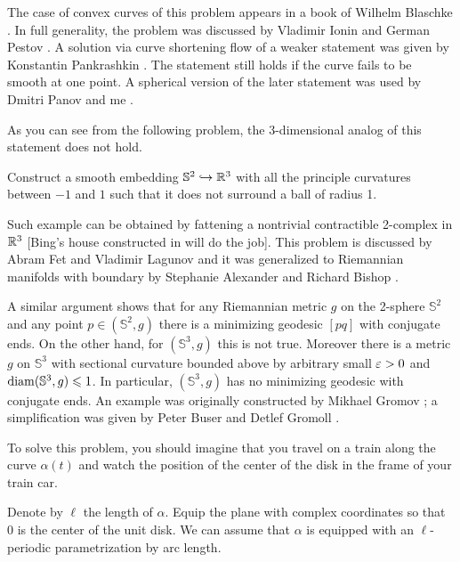 The case of convex curves of this problem appears in a book of Wilhelm Blaschke \cite[see \S 24 in][]{blaschke}.
In full generality, the problem was discussed by Vladimir Ionin and German Pestov \cite{pestov-ionin}. %
A solution via curve shortening flow of a weaker statement 
was given by Konstantin Pankrashkin \cite{pankrashkin}.
The statement still holds if the curve fails to be smooth at one point.
A spherical version of the later statement 
was used by Dmitri Panov and me \cite{panov-petrunin-ramification}.

As you can see from the following problem, the 3-dimensional analog of this statement does not hold.

\begin{pr}
Construct a smooth embedding $\mathbb{S}^2\hookrightarrow \mathbb{R}^3$ 
with all the principle curvatures between $-1$ and $1$
such that it does not surround a ball of radius 1.
\end{pr}

Such example can be obtained by fattening a nontrivial contractible 2-complex in $\mathbb{R}^3$ 
[Bing's house constructed in  will do the job].
This problem is discussed by Abram Fet and Vladimir Lagunov \cite{lagunov-2,lagunov-fet} 
and it was generalized to Riemannian manifolds with boundary by Stephanie Alexander and Richard Bishop \cite{alexander-bishop}.

A similar argument shows that for any Riemannian metric $g$ on the 2-sphere $\mathbb S^2$ 
and any point $p\in(\mathbb S^2,g)$ there is a minimizing geodesic $[pq]$ with conjugate ends.
On the other hand, for $(\mathbb S^3,g)$ this is not true.
Moreover there is a metric $g$ on $\mathbb{S}^3$ 
with sectional curvature bounded above by arbitrary small $\varepsilon>0$ and $\operatorname{\rm diam}\nolimits(\mathbb{S}^3,g)\leqslant 1$.
In particular, $(\mathbb S^3,g)$ has no minimizing geodesic with conjugate ends.
An example was originally constructed by Mikhael Gromov \cite{gromov-almost-flat}; 
a simplification was given by 
Peter Buser
and Detlef Gromoll \cite{buser-gromoll}.

To solve this problem,
you should imagine that you travel on a train along the curve $\alpha(t)$
and watch the position of the center of the disk in the frame of your train car.

\medskip

Denote by $\ell$ the length of $\alpha$.
Equip the plane with complex coordinates so that $0$ is the center of the unit disk.
We can assume that $\alpha$ is equipped with an $\ell$-periodic parametrization by arc length.

